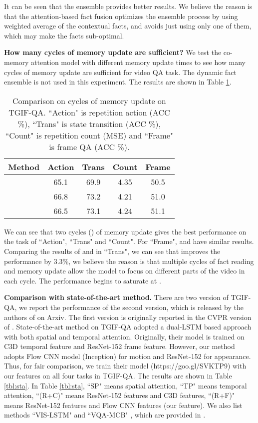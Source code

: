 \documentclass[10pt,twocolumn,letterpaper]{article}
\begin{document}
It can be seen that the ensemble provides better results. We believe the reason is that the attention-based fact fusion optimizes the ensemble process by using weighted average of the contextual facts, and avoids just using only one of them, which may make the facts sub-optimal.

\textbf{How many cycles of memory update are sufficient?} We test the co-memory attention model with different memory update times  to see how many cycles of memory update are sufficient for video QA task. The dynamic fact ensemble is not used in this experiment. The results are shown in Table \ref{tbl:time}.

\begin{table}[h]
\centering
\caption{ Comparison on cycles of memory update on TGIF-QA. ``Action" is repetition action (ACC \%), ``Trans" is state transition (ACC \%), ``Count" is repetition count (MSE) and ``Frame" is frame QA (ACC \%).}
\vspace{5pt}
\label{tbl:time}
\begin{tabular}{l|cccc}
\hline
Method& Action & Trans & Count & Frame \\ \hline
   &    65.1    &     69.9  &   4.35    &   50.5     \\ \hline
   &   66.8     &    73.2   &    4.21   &     51.0  \\ \hline
   &   66.5       &    73.1   &    4.24   &     51.1  \\ \hline
\end{tabular}
\end{table}
We can see that two cycles () of memory update gives the best performance on the task of ``Action", ``Trans" and ``Count". For ``Frame",  and  have similar results. Comparing the results of  and  in ``Trans", we can see that  improves the performance by 3.3\%, we believe the reason is that multiple cycles of fact reading and memory update allow the model to focus on different parts of the video in each cycle. The performance begins to saturate at . 

\textbf{Comparison with state-of-the-art method.} There are two version of TGIF-QA, we report the performance of the second version, which is released by the authors of \cite{Jang_2017_CVPR} on Arxiv. The first version is originally reported in the CVPR version of \cite{Jang_2017_CVPR}.
State-of-the-art method \cite{Jang_2017_CVPR} on TGIF-QA adopted a dual-LSTM based approach with both spatial and temporal attention. Originally, their model is trained on C3D \cite{Tran_2015_ICCV_c3d} temporal feature and ResNet-152 \cite{He_2016_CVPR_resnet} frame feature. However, our method adopts Flow CNN model (Inception) for motion and ResNet-152 for appearance. Thus, for fair comparison, we train their model (https://goo.gl/SVKTP9) with our features on all four tasks in TGIF-QA. The results are shown in Table \ref{tbl:sta}.   In Table \ref{tbl:sta}, ``SP" means spatial attention, ``TP" means temporal attention, ``(R+C)" means ResNet-152 features and C3D features, ``(R+F)" means ResNet-152 features and Flow CNN features (our feature). We also list methods ``VIS-LSTM" \cite{ren2015exploring} and ``VQA-MCB" \cite{fukui2016multimodal}, which are provided in \cite{Jang_2017_CVPR}.
\end{document}
